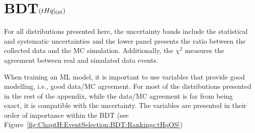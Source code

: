 \FloatBarrier


\section{BDT$(tHq|_{\text{OS}})$}
\label{chap:Appendix:BDT_Variables:OS_tHq}
For all distributions presented here, the uncertainty bands include the statistical and 
systematic uncertainties and the lower panel presents the ratio between the collected 
data and the MC simulation. Additionally, the $\chi^2$ measures the agreement between 
real and simulated data events.

When training an ML model, it is important to use variables that provide good modelling, i.e., good data/MC agreement.
For most of the distributions presented in the rest of the appendix, while the data/MC agreement is far from being exact,  
it is compatible with the uncertainty. The variables are presented in their order of importance within the BDT (see
Figure~\ref{fig:ChaptH:EventSelection:BDT:Rankings:tHqOS})





